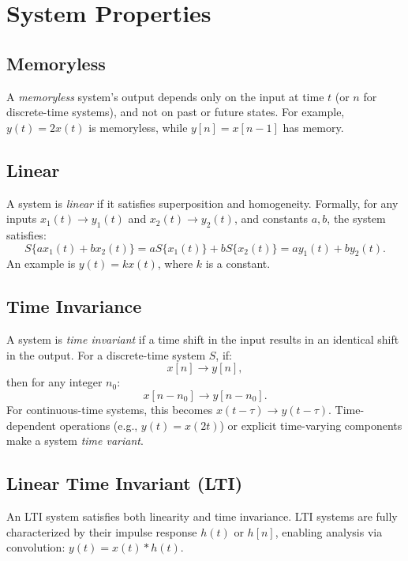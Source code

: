 \section{System Properties}

\subsection{Memoryless}
A \emph{memoryless} system's output depends only on the input at time \( t \) (or \( n \) for discrete-time systems), and not on past or future states. For example, \( y(t) = 2x(t) \) is memoryless, while \( y[n] = x[n-1] \) has memory.

\subsection{Linear}
A system is \emph{linear} if it satisfies superposition and homogeneity. Formally, for any inputs \( x_1(t) \rightarrow y_1(t) \) and \( x_2(t) \rightarrow y_2(t) \), and constants \( a, b \), the system satisfies:
\[
    S\{a x_1(t) + b x_2(t)\} = a S\{x_1(t)\} + b S\{x_2(t)\} = a y_1(t) + b y_2(t).
\]
An example is \( y(t) = kx(t) \), where \( k \) is a constant.

\subsection{Time Invariance}
A system is \emph{time invariant} if a time shift in the input results in an identical shift in the output. For a discrete-time system \( S \), if:
\[
    x[n] \rightarrow y[n],
\]
then for any integer \( n_0 \):
\[
    x[n - n_0] \rightarrow y[n - n_0].
\]
For continuous-time systems, this becomes \( x(t - \tau) \rightarrow y(t - \tau) \). Time-dependent operations (e.g., \( y(t) = x(2t) \)) or explicit time-varying components make a system \emph{time variant}.

\subsection{Linear Time Invariant (LTI)}
An LTI system satisfies both linearity and time invariance. LTI systems are fully characterized by their impulse response \( h(t) \) or \( h[n] \), enabling analysis via convolution: \( y(t) = x(t) * h(t) \).

